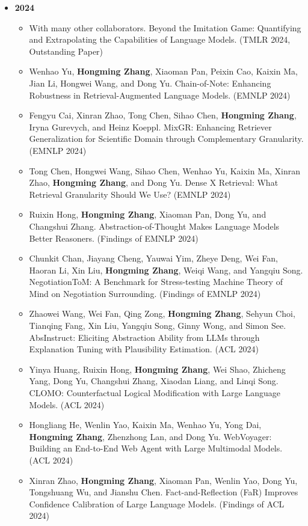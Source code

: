 \begin{itemize}[leftmargin=*, itemsep=0.35em, topsep=0.2em]
  \item[] \textbf{2024}
  \begin{itemize}[leftmargin=1.5em, itemsep=0.2em, topsep=0.1em]
    \item With many other collaborators. Beyond the Imitation Game: Quantifying and Extrapolating the Capabilities of Language Models. (TMLR 2024, Outstanding Paper)
    \item Wenhao Yu, \textbf{Hongming Zhang}, Xiaoman Pan, Peixin Cao, Kaixin Ma, Jian Li, Hongwei Wang, and Dong Yu. Chain-of-Note: Enhancing Robustness in Retrieval-Augmented Language Models. (EMNLP 2024)
    \item Fengyu Cai, Xinran Zhao, Tong Chen, Sihao Chen, \textbf{Hongming Zhang}, Iryna Gurevych, and Heinz Koeppl. MixGR: Enhancing Retriever Generalization for Scientific Domain through Complementary Granularity. (EMNLP 2024)
    \item Tong Chen, Hongwei Wang, Sihao Chen, Wenhao Yu, Kaixin Ma, Xinran Zhao, \textbf{Hongming Zhang}, and Dong Yu. Dense X Retrieval: What Retrieval Granularity Should We Use? (EMNLP 2024)
    \item Ruixin Hong, \textbf{Hongming Zhang}, Xiaoman Pan, Dong Yu, and Changshui Zhang. Abstraction-of-Thought Makes Language Models Better Reasoners. (Findings of EMNLP 2024)
    \item Chunkit Chan, Jiayang Cheng, Yauwai Yim, Zheye Deng, Wei Fan, Haoran Li, Xin Liu, \textbf{Hongming Zhang}, Weiqi Wang, and Yangqiu Song. NegotiationToM: A Benchmark for Stress-testing Machine Theory of Mind on Negotiation Surrounding. (Findings of EMNLP 2024)
    \item Zhaowei Wang, Wei Fan, Qing Zong, \textbf{Hongming Zhang}, Sehyun Choi, Tianqing Fang, Xin Liu, Yangqiu Song, Ginny Wong, and Simon See. AbsInstruct: Eliciting Abstraction Ability from LLMs through Explanation Tuning with Plausibility Estimation. (ACL 2024)
    \item Yinya Huang, Ruixin Hong, \textbf{Hongming Zhang}, Wei Shao, Zhicheng Yang, Dong Yu, Changshui Zhang, Xiaodan Liang, and Linqi Song. CLOMO: Counterfactual Logical Modification with Large Language Models. (ACL 2024)
    \item Hongliang He, Wenlin Yao, Kaixin Ma, Wenhao Yu, Yong Dai, \textbf{Hongming Zhang}, Zhenzhong Lan, and Dong Yu. WebVoyager: Building an End-to-End Web Agent with Large Multimodal Models. (ACL 2024)
    \item Xinran Zhao, \textbf{Hongming Zhang}, Xiaoman Pan, Wenlin Yao, Dong Yu, Tongshuang Wu, and Jianshu Chen. Fact-and-Reflection (FaR) Improves Confidence Calibration of Large Language Models. (Findings of ACL 2024)

\end{itemize}
\end{itemize}
